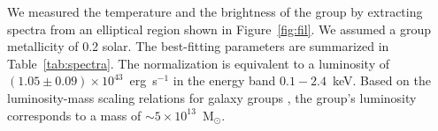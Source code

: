 We measured the temperature and the brightness of the group by extracting spectra from an elliptical region shown in Figure~\ref{fig:fil}. We assumed a group metallicity of 0.2 solar. The best-fitting parameters are summarized in Table~\ref{tab:spectra}. The normalization is equivalent to a luminosity of $(1.05\pm 0.09) \times 10^{43}$~erg~s$^{-1}$ in the energy band $0.1-2.4$~keV. Based on the luminosity-mass scaling relations for galaxy groups \citep[e.g.,][]{Connor2014}, the group's luminosity corresponds to a mass of $\sim 5\times 10^{13}$~M$_\odot$.

